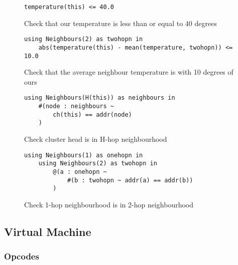\begin{figure}[H]
\begin{verbatim}
temperature(this) <= 40.0
\end{verbatim}
\caption{Check that our temperature is less than or equal to 40 degrees}
\end{figure}

\begin{figure}[H]
\begin{verbatim}
using Neighbours(2) as twohopn in
    abs(temperature(this) - mean(temperature, twohopn)) <= 10.0
\end{verbatim}
\caption{Check that the average neighbour temperature is with 10 degrees of ours}
\end{figure}


\begin{figure}[H]
\begin{verbatim}
using Neighbours(H(this)) as neighbours in
    #(node : neighbours ~
        ch(this) == addr(node)
    )
\end{verbatim}
\caption{Check cluster head is in H-hop neighbourhood}
\end{figure}



\begin{figure}[H]
\begin{verbatim}
using Neighbours(1) as onehopn in
    using Neighbours(2) as twohopn in
        @(a : onehopn ~
            #(b : twohopn ~ addr(a) == addr(b))
        )
\end{verbatim}
\caption{Check 1-hop neighbourhood is in 2-hop neighbourhood}
\end{figure}


\subsection{Virtual Machine}

\subsubsection{Opcodes}

